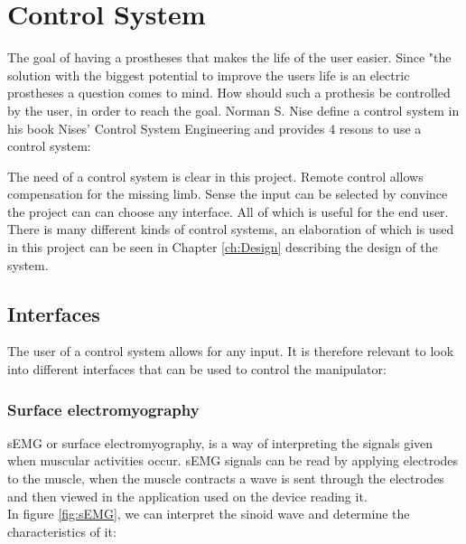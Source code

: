 \section{Control System}
The goal of having a prostheses that makes the life of the user easier. Since "the solution with the biggest potential to improve the users life is an electric prostheses a question comes to mind. How should such a prothesis be controlled by the user, in order to reach the goal. 
Norman S. Nise define a control system in his book Nises' Control System Engineering and provides 4 resons to use a control system:\\
 \label{Quote1}
\noindent The need of a control system is clear in this project. Remote control allows compensation for the missing limb. Sense the input can be selected by convince the project can can choose any interface. All of which is useful for the end user. There is many different kinds of control systems, an elaboration of which is used in this project can be seen in Chapter \ref{ch:Design} describing the design of the system. 
\subsection*{Interfaces}
The user of a control system allows for any input. It is therefore relevant to look into different interfaces that can be used to control the manipulator:

\subsubsection*{Surface electromyography}\label{sEMG}
sEMG or surface electromyography, is a way of interpreting the signals given when muscular activities occur. sEMG signals can be read by applying electrodes to the muscle, when the muscle contracts a wave is sent through the electrodes and then viewed in the application used on the device reading it.\\
In figure \ref{fig:sEMG}, we can interpret the sinoid wave and determine the characteristics of it:

